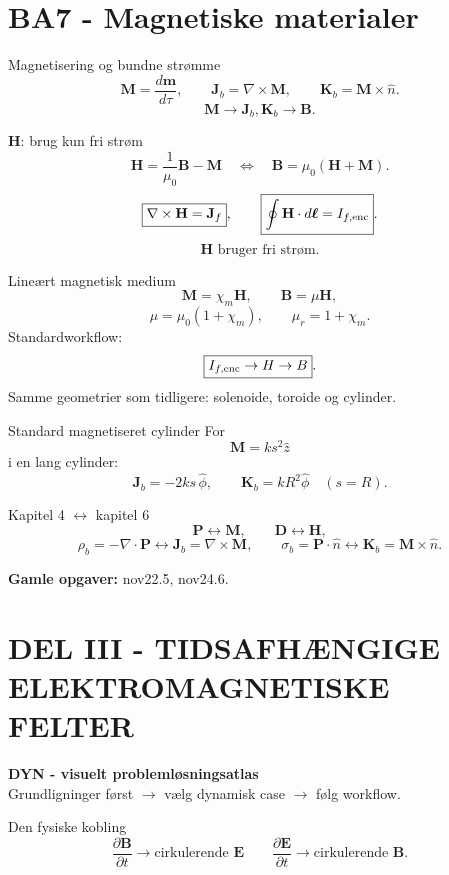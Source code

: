 \documentclass[10pt,a4paper]{article}
\begin{document}
\section*{BA7 - Magnetiske materialer}
{}
\begin{casebox}{Magnetisering og bundne strømme}
\[
\boxed{\mathbf M=\frac{d\mathbf m}{d\tau}},
\qquad
\boxed{\mathbf J_b=\nabla\times\mathbf M},
\qquad
\boxed{\mathbf K_b=\mathbf M\times\hat n}.
\]
\[
\boxed{\mathbf M\to\mathbf J_b,\mathbf K_b\to\mathbf B}.
\]
\end{casebox}
\begin{casebox}{$\mathbf H$: brug kun fri strøm}
\[
\boxed{\mathbf H=\frac1{\mu_0}\mathbf B-\mathbf M}
\quad\Longleftrightarrow\quad
\boxed{\mathbf B=\mu_0(\mathbf H+\mathbf M)}.
\]
\[
\boxed{\nabla\times\mathbf H=\mathbf J_f},
\qquad
\boxed{\oint\mathbf H\cdot d\boldsymbol\ell=I_{f,\rm enc}}.
\]
\[
\boxed{\mathbf H\text{ bruger fri strøm}}.
\]
\end{casebox}
\begin{casebox}{Lineært magnetisk medium}
\[
\mathbf M=\chi_m\mathbf H,
\qquad
\boxed{\mathbf B=\mu\mathbf H},
\]
\[
\mu=\mu_0(1+\chi_m),
\qquad
\mu_r=1+\chi_m.
\]
Standardworkflow:
\[
\boxed{I_{f,\rm enc}\to H\to B}.
\]
Samme geometrier som tidligere: solenoide, toroide og cylinder.
\end{casebox}
\begin{casebox}{Standard magnetiseret cylinder}
For
\[
\mathbf M=ks^2\hat z
\]
i en lang cylinder:
\[
\boxed{\mathbf J_b=-2ks\,\hat\phi},
\qquad
\boxed{\mathbf K_b=kR^2\hat\phi}\quad(s=R).
\]
\end{casebox}
\begin{quickbox}{Kapitel 4 $\leftrightarrow$ kapitel 6}
\[
\mathbf P\leftrightarrow\mathbf M,\qquad
\mathbf D\leftrightarrow\mathbf H,
\]
\[
\rho_b=-\nabla\cdot\mathbf P
\leftrightarrow
\mathbf J_b=\nabla\times\mathbf M,
\qquad
\sigma_b=\mathbf P\cdot\hat n
\leftrightarrow
\mathbf K_b=\mathbf M\times\hat n.
\]
\end{quickbox}
\textbf{Gamle opgaver:} nov22.5, nov24.6.

\newpage
\section*{DEL III - TIDSAFHÆNGIGE ELEKTROMAGNETISKE FELTER}
{}
\begin{center}
{\Large\bfseries DYN - visuelt problemløsningsatlas}\\[1mm]
{\small Grundligninger først $\to$ vælg dynamisk case $\to$ følg workflow.}
\end{center}
\begin{quickbox}{Den fysiske kobling}
\[
\boxed{\frac{\partial\mathbf B}{\partial t}\to\text{cirkulerende }\mathbf E}
\qquad
\boxed{\frac{\partial\mathbf E}{\partial t}\to\text{cirkulerende }\mathbf B}.
\]
\end{quickbox}
\end{document}
